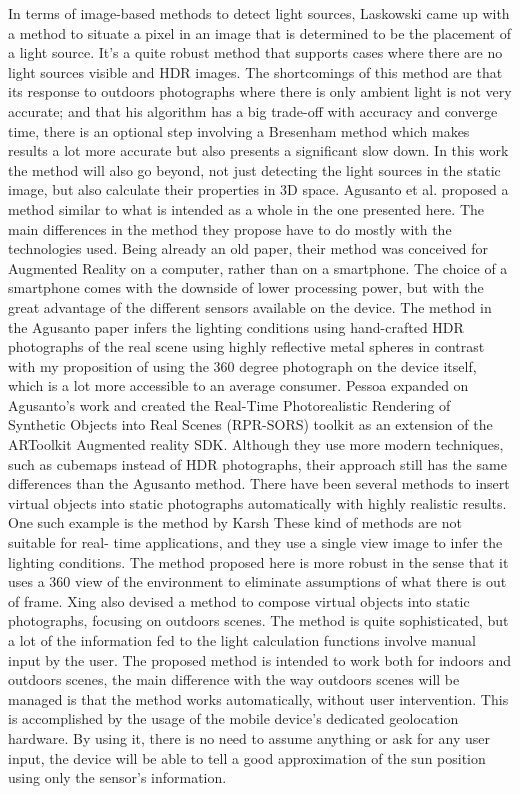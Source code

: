 
In terms of image-based methods to detect light sources, Laskowski\cite{Laskowski2007} came up with a method to situate a pixel in an image that is determined to be the placement of a light source. It's a quite robust method that supports cases where there are no light sources visible and HDR images. The shortcomings of this method are that its response to outdoors photographs where there is only ambient light is not very accurate; and that his algorithm has a big trade-off with accuracy and converge time, there is an optional step involving a Bresenham method which makes results a lot more accurate but also presents a significant slow down. In this work the method will also go beyond, not just detecting the light sources in the static image, but also calculate their properties in 3D space. 
Agusanto et al.\cite{agusanto2003} proposed a method similar to what is intended as a whole in the one presented here. The main differences in the method they propose have to do mostly with the technologies used. Being already an old paper, their method was conceived for Augmented Reality on a computer, rather than on a smartphone. The choice of a smartphone comes with the downside of lower processing power, but with the great advantage of the different sensors available on the device. The method in the Agusanto paper infers the lighting conditions using hand-crafted HDR photographs of the real scene using highly reflective metal spheres in contrast with my proposition of using the 360 degree photograph on the device itself, which is a lot more accessible to an average consumer.\newline
Pessoa\cite{pessoa2011} expanded on Agusanto's work and created the Real-Time Photorealistic Rendering of Synthetic Objects into Real Scenes (RPR-SORS) toolkit as an extension of the ARToolkit Augmented reality SDK. Although they use more modern techniques, such as cubemaps instead of HDR photographs, their approach still has the same differences than the Agusanto method.\newline
There have been several methods to insert virtual objects into static photographs automatically with highly realistic results. One such example is the method by Karsh \cite{karsh2014} These kind of methods are not suitable for real- time applications, and they use a single view image to infer the lighting conditions. The method proposed here is more robust in the sense that it uses a 360 view of the environment to eliminate assumptions of what there is out of frame.\newline
Xing\cite{xing2013} also devised a method to compose virtual objects into static photographs, focusing on outdoors scenes. The method is quite sophisticated, but a lot of the information fed to the light calculation functions involve manual input by the user. The proposed method is intended to work both for indoors and outdoors scenes, the main difference with the way outdoors scenes will be managed is that the method works automatically, without user intervention. This is accomplished by the usage of the mobile device's dedicated geolocation hardware. By using it, there is no need to assume anything or ask for any user input, the device will be able to tell a good approximation of the sun position using only the sensor's information.